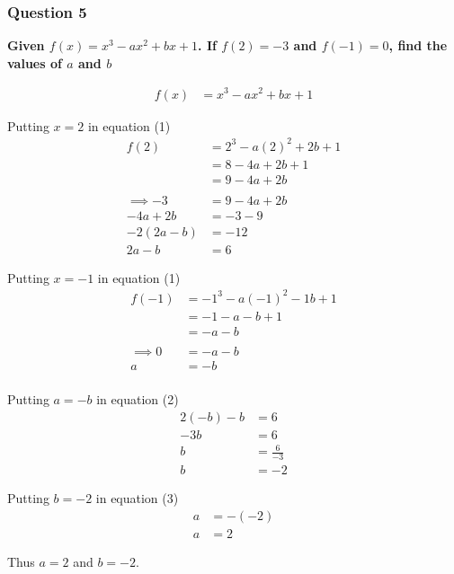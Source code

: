 \documentclass[crop=false,fleqn]{standalone}
\begin{document}
    \subsubsection{Question 5}
    \textbf{Given $f(x)=x^3-ax^2+bx+1$. If $f(2)=-3$ and $f(-1)=0$, find the values of $a$ and $b$}

    \begin{align*}
        f(x) &= x^3 - ax^2 + bx + 1 \tag{1}
    \end{align*}

    Putting $x = 2$ in equation (1)
    \begin{align*}
        f(2) &= 2^3 - a(2)^2 + 2b + 1 \\
            &= 8 - 4a + 2b + 1 \\
            &= 9 - 4a + 2b \\
        \\
        \implies -3 &= 9 - 4a + 2b \tag{As $f(2) = -3$} \\
            -4a + 2b &= -3 -9 \tag{By Rearranging} \\
            -2(2a - b) &= -12 \\
            2a - b &= 6 \tag{2}
    \end{align*}



    Putting $x = -1$ in equation (1)
    \begin{align*}
        f(-1) &= -1^3 - a(-1)^2 - 1b + 1 \\
            &= -1 - a - b + 1 \\
            &= -a -b \\
        \\
        \implies 0 &= -a -b \tag{As $f(-1) = 0$} \\
            a &= -b \tag{3} \\
    \end{align*}

    Putting $a = -b$ in equation (2)
    \begin{align*}
        2(-b) -b &= 6 \\
        -3b &= 6 \\
        b &= \frac{6}{-3} \\
        b &= -2
    \end{align*}

    Putting $b = -2$ in equation (3)
    \begin{align*}
        a &= - (-2) \\
        a &= 2
    \end{align*}

    Thus $a=2$ and $b=-2$.
\end{document}
